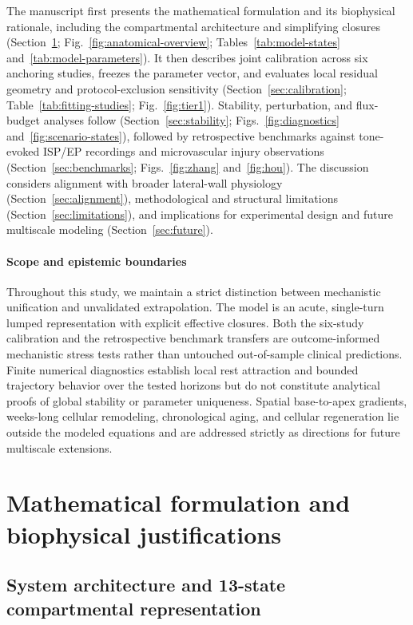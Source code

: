 \documentclass[final,5p,times]{elsarticle}
\begin{document}
The manuscript first presents the mathematical formulation and its biophysical rationale, including the compartmental architecture and simplifying closures (Section~\ref{sec:formulation}; Fig.~\ref{fig:anatomical-overview}; Tables~\ref{tab:model-states} and~\ref{tab:model-parameters}). It then describes joint calibration across six anchoring studies, freezes the parameter vector, and evaluates local residual geometry and protocol-exclusion sensitivity (Section~\ref{sec:calibration}; Table~\ref{tab:fitting-studies}; Fig.~\ref{fig:tier1}). Stability, perturbation, and flux-budget analyses follow (Section~\ref{sec:stability}; Figs.~\ref{fig:diagnostics} and~\ref{fig:scenario-states}), followed by retrospective benchmarks against tone-evoked ISP/EP recordings and microvascular injury observations (Section~\ref{sec:benchmarks}; Figs.~\ref{fig:zhang} and~\ref{fig:hou}). The discussion considers alignment with broader lateral-wall physiology (Section~\ref{sec:alignment}), methodological and structural limitations (Section~\ref{sec:limitations}), and implications for experimental design and future multiscale modeling (Section~\ref{sec:future}).

\paragraph*{Scope and epistemic boundaries}
Throughout this study, we maintain a strict distinction between mechanistic unification and unvalidated extrapolation. The model is an acute, single-turn lumped representation with explicit effective closures. Both the six-study calibration and the retrospective benchmark transfers are outcome-informed mechanistic stress tests rather than untouched out-of-sample clinical predictions. Finite numerical diagnostics establish local rest attraction and bounded trajectory behavior over the tested horizons but do not constitute analytical proofs of global stability or parameter uniqueness. Spatial base-to-apex gradients, weeks-long cellular remodeling, chronological aging, and cellular regeneration lie outside the modeled equations and are addressed strictly as directions for future multiscale extensions.

\section{Mathematical formulation and biophysical justifications}\label{sec:formulation}

\subsection{System architecture and 13-state compartmental representation}\label{sec:formulation-states}
\end{document}
